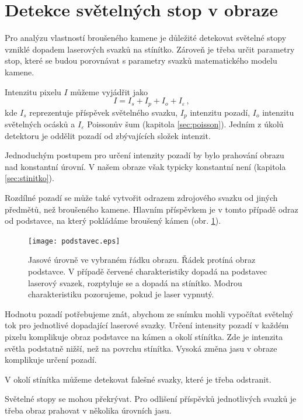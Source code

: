 \part{Detekce světelných stop v obraze}
\label{sec:detection}
Pro analýzu vlastností broušeného kamene je důležité detekovat světelné stopy vzniklé dopadem laserových svazků na stínítko. Zároveň je třeba určit parametry stop, které se budou porovnávat s parametry svazků matematického modelu kamene. 

Intenzitu pixelu $I$ můžeme vyjádřit jako 
\begin{equation}
	I = I_{s}+I_{p}+I_{o}+I_{\varepsilon}\,,
	\label{eq:intensitu_sum}
\end{equation}
 kde $I_{s}$ reprezentuje příspěvek světelného svazku, $I_{p}$ intenzitu pozadí, $I_{o}$ intenzitu světelných ocásků a $I_{\varepsilon}$ Poissonův šum (kapitola \ref{sec:poisson}). Jedním z úkolů detektoru je oddělit pozadí od zbývajících složek intenzit. %
 
Jednoduchým postupem pro určení intenzity pozadí by bylo prahování obrazu nad konstantní úrovní. V našem obraze však typicky konstantní není (kapitola \ref{sec:stinitko}). 

Rozdílné pozadí se může také vytvořit odrazem zdrojového svazku od jiných předmětů, než broušeného kamene. Hlavním příspěvkem je v tomto případě odraz od podstavce, na který pokládáme broušený kámen (obr. \ref{fig: podstavec}).

\begin{figure}[htps]
\centering
\texttt{[image: podstavec.eps]}
\caption{Jasové úrovně ve vybraném řádku obrazu. Řádek protíná obraz podstavce. V případě červené charakteristiky dopadá na podstavec laserový svazek, rozptyluje se a dopadá na stínítko. Modrou charakteristiku pozorujeme, pokud je laser vypnutý.}
\label{fig: podstavec}
\end{figure}

Hodnotu pozadí potřebujeme znát, abychom ze snímku mohli vypočítat světelný tok pro jednotlivé dopadající laserové svazky. Určení intensity pozadí v každém pixelu komplikuje obraz podstavce na kámen a okolí stínítka. Zde je intenzita světla podstatně nižší, než na povrchu stínítka. Vysoká změna jasu v obraze komplikuje určení pozadí.  

V okolí stínítka můžeme detekovat falešné svazky, které je třeba odstranit. 

Světelné stopy se mohou překrývat. Pro odlišení příspěvků jednotlivých svazků je třeba obraz prahovat v několika úrovních jasu.

